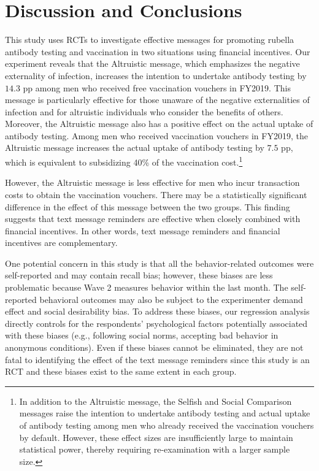 \documentclass[
      12pt,
    a4paper
]{article}
\begin{document}
\hypertarget{conclusion}{%
\section{Discussion and Conclusions}\label{conclusion}}

This study uses RCTs to investigate effective messages for promoting rubella antibody testing and vaccination in two situations using financial incentives. Our experiment reveals that the Altruistic message, which emphasizes the negative externality of infection, increases the intention to undertake antibody testing by \(14.3\) pp among men who received free vaccination vouchers in FY2019. This message is particularly effective for those unaware of the negative externalities of infection and for altruistic individuals who consider the benefits of others. Moreover, the Altruistic message also has a positive effect on the actual uptake of antibody testing. Among men who received vaccination vouchers in FY2019, the Altruistic message increases the actual uptake of antibody testing by \(7.5\) pp, which is equivalent to subsidizing 40\% of the vaccination cost.\footnote{In addition to the Altruistic message, the Selfish and Social Comparison messages raise the intention to undertake antibody testing and actual uptake of antibody testing among men who already received the vaccination vouchers by default. However, these effect sizes are insufficiently large to maintain statistical power, thereby requiring re-examination with a larger sample size.}

However, the Altruistic message is less effective for men who incur transaction costs to obtain the vaccination vouchers. There may be a statistically significant difference in the effect of this message between the two groups. This finding suggests that text message reminders are effective when closely combined with financial incentives. In other words, text message reminders and financial incentives are complementary.

One potential concern in this study is that all the behavior-related outcomes were self-reported and may contain recall bias; however, these biases are less problematic because Wave 2 measures behavior within the last month. The self-reported behavioral outcomes may also be subject to the experimenter demand effect and social desirability bias. To address these biases, our regression analysis directly controls for the respondents' psychological factors potentially associated with these biases (e.g., following social norms, accepting bad behavior in anonymous conditions). Even if these biases cannot be eliminated, they are not fatal to identifying the effect of the text message reminders since this study is an RCT and these biases exist to the same extent in each group.
\end{document}
